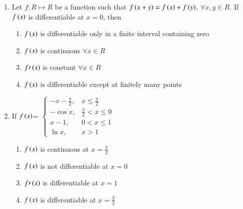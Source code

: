 \documentclass[journal,12pt]{IEEEtran}
\theoremstyle{remark}
\begin{document}
\begin{enumerate}
    \hfill 
    {}
    
    \begin{multicols}{4}
    \begin{enumerate}
        \item $a=2$ 
        \item $a=1$
        \item $L=\frac{1}{64}$
        \item $L=\frac{1}{32}$
    \end{enumerate}
    \end{multicols}	    


    \item 
    Let $f:R \mapsto R$ be a function such that $f\left(x+y\right)=f\left(x\right)+f\left(y\right)$, $\forall x,y\in R$. If $f\left(x\right)$ is differentiable at $x=0$, then 

    \hfill 
    {}
    
    \begin{enumerate}

        \item $f\left(x\right)$ is differentiable only in a finite interval containing zero 
        \item $f\left(x\right)$ is continuous $\forall x\in R$
	\item $f{\prime}\left(x\right)$ is constant $\forall x\in R$
        \item $f\left(x\right)$ is differentiable except at finitely many points 
    \end{enumerate}


    \item 
    If $f\left(x\right)$= 
    $\begin{cases}
        -x-\frac{\pi}{2}, & x\leq \frac{\pi}{2} \\
        -\cos x, & \frac{\pi}{2}<x\leq 0 \\
        x-1, & 0<x\leq1 \\
        \ln x, & x>1
    \end{cases}$ 

    \hfill 
    {}
    
    \begin{enumerate}

        \item $f\left(x\right)$ is continuous at $x=\frac{\pi}{2}$
        \item $f\left(x\right)$ is not differentiable at $x=0$
	\item $f{\prime}\left(x\right)$ is differentiable at $x=1$
        \item $f\left(x\right)$ is differentiable at $x=\frac{3}{2}$
    \end{enumerate}



\end{enumerate}
\end{document}
